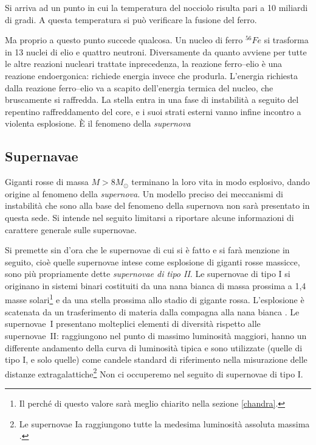 Si arriva ad un punto in cui la temperatura del nocciolo risulta pari a 10 miliardi di gradi. A questa temperatura si può verificare la fusione del ferro.
\par
Ma proprio a questo punto succede qualcosa.
Un nucleo di ferro $^{56}Fe$ si trasforma in 13 nuclei di elio e quattro neutroni. Diversamente da quanto avviene per tutte le altre reazioni nucleari trattate inprecedenza, la reazione ferro--elio è una reazione endoergonica: richiede energia invece che produrla.
L'energia richiesta dalla reazione ferro--elio va a scapito dell'energia termica del nucleo, che bruscamente si raffredda.
La stella entra in una fase di instabilit\`{a} a seguito del repentino raffreddamento del core, e i suoi strati esterni vanno infine incontro a violenta  esplosione. \`E il fenomeno della \emph{supernova}
\subsection{Supernavae}
Giganti rosse di massa $M>8 M_{\odot}$ terminano la loro vita in modo esplosivo, dando origine al fenomeno della \emph{supernova}. Un modello preciso dei meccanismi di instabilit\`{a} che sono alla base del fenomeno della supernova non sar\`{a} presentato in questa sede. Si intende nel seguito limitarsi a riportare alcune informazioni di carattere generale sulle supernovae.
\par
Si premette sin d'ora che le supernovae di cui si è fatto e si far\`{a} menzione in seguito, cioè quelle supernovae intese come esplosione di giganti rosse massicce, sono più propriamente dette \emph{supernovae di tipo II}. Le supernovae di tipo I si originano in sistemi binari costituiti da una nana bianca di massa prossima a 1,4 masse solari\footnote{Il perch\'{e} di questo valore sar\`{a} meglio chiarito nella sezione \ref{chandra}.} e da una stella prossima allo stadio di gigante rossa. L'esplosione \`e scatenata da un trasferimento di materia dalla compagna alla nana bianca \Cite{freedman}. Le \mbox{supernovae I} presentano molteplici elementi di diversit\`{a} rispetto alle \mbox{supernovae II:} raggiungono nel punto di massimo luminosit\`{a} maggiori, hanno un differente andamento della curva di luminosit\`{a} tipica e sono utilizzate (quelle di tipo I, e solo quelle) come candele standard di riferimento nella misurazione delle distanze extragalattiche\footnote{Le supernovae Ia raggiungono tutte la medesima luminosit\`a assoluta massima \citep{burnham, hack}.} Non ci occuperemo nel seguito di supernovae di tipo I.
\par

